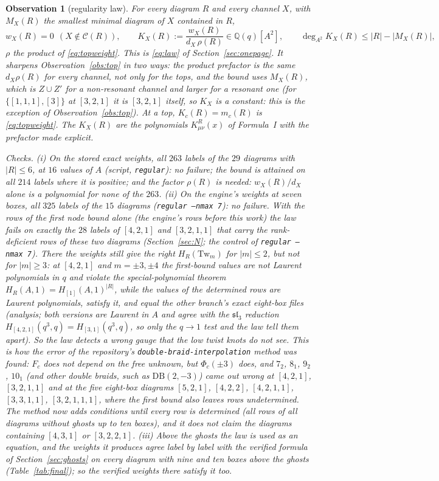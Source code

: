 \documentclass[11pt]{article}
\newtheorem{observation}{Observation}
\newcommand{\Tw}{\mathrm{Tw}}
\newcommand{\Chan}{\mathcal C}
\newcommand{\LMPH}[1]{\texttt{#1}}
\begin{document}
\begin{observation}[regularity law]\label{obs:law}
For every diagram $R$ and every channel $X$, with $M_X(R)$ the smallest minimal diagram of $X$ contained in $R$,
\[
w_X(R)=0\ \ (X\notin\Chan(R)),\qquad
K_X(R):=\frac{w_X(R)}{d_X\,\rho(R)}\in\mathbb Q(q)[A^2],\qquad \deg_{A^2}K_X(R)\le|R|-|M_X(R)|,
\]
$\rho$ the product of \eqref{eq:topweight}.  This is \eqref{eq:law} of Section~\ref{sec:onepage}.  It sharpens
Observation~\ref{obs:top} in two ways: the product prefactor is the same $d_X\rho(R)$ for every channel, not only for the
tops, and the bound uses $M_X(R)$, which is $Z\cup Z'$ for a non-resonant channel and larger for a resonant one (for
$\{[1,1,1],[3]\}$ at $[3,2,1]$ it is $[3,2,1]$ itself, so $K_X$ is a constant: this is the exception of
Observation~\ref{obs:top}).  At a top, $K_c(R)=m_c(R)$ is \eqref{eq:topweight}.  The $K_X(R)$ are the polynomials
$K^R_{\mu\nu}(x)$ of Formula~I with the prefactor made explicit.

\emph{Checks.}  (i) On the stored exact weights, all $263$ labels of the $29$ diagrams with $|R|\le6$, at $16$ values of
$A$ (script, \LMPH{regular}): no failure; the bound is attained on all $214$ labels where it is positive; and the factor
$\rho(R)$ is needed: $w_X(R)/d_X$ alone is a polynomial for none of the $263$.  (ii) On the engine's weights at seven boxes,
all $325$ labels of the $15$ diagrams (\LMPH{regular --nmax 7}): no failure.  With the rows of the first node bound
alone (the engine's rows before this work) the law fails on exactly the $28$ labels of $[4,2,1]$ and $[3,2,1,1]$ that
carry the rank-deficient rows of these two diagrams (Section~\ref{sec:N}; the control of \LMPH{regular --nmax 7}).
There the weights still give the right $H_R(\Tw_m)$ for $|m|\le2$, but not for $|m|\ge3$: at $[4,2,1]$ and
$m=\pm3,\pm4$ the first-bound values are not Laurent polynomials in $q$ and violate the special-polynomial theorem
$H_R(A,1)=H_{[1]}(A,1)^{|R|}$, while the values of the determined rows are Laurent polynomials, satisfy it, and equal the
other branch's exact eight-box files (analysis; both versions are Laurent in $A$ and agree with the $\mathfrak{sl}_3$
reduction $H_{[4,2,1]}(q^3,q)=H_{[3,1]}(q^3,q)$, so only the $q\to1$ test and the law tell them apart).  So the law
detects a wrong gauge that the low twist knots do not see.  This is how the error of the repository's
\LMPH{double-braid-interpolation} method was found: $F_c$ does not depend on the free unknown, but $\Phi_c(\pm3)$ does,
and $7_2$, $8_1$, $9_2$, $10_1$ (and other double braids, such as $\mathrm{DB}(2,-3)$) came out wrong at $[4,2,1]$, $[3,2,1,1]$
and at the five eight-box diagrams $[5,2,1]$, $[4,2,2]$, $[4,2,1,1]$, $[3,3,1,1]$, $[3,2,1,1,1]$, where the first bound
also leaves rows undetermined.  The method now adds conditions until every row is determined (all rows of all
diagrams without ghosts up to ten boxes), and it does not claim the diagrams containing $[4,3,1]$ or $[3,2,2,1]$.  (iii) Above the ghosts the law is used as an equation, and the
weights it produces agree label by label with the verified formula of Section~\ref{sec:ghosts} on every diagram with nine
and ten boxes above the ghosts (Table~\ref{tab:final}); so the verified weights there satisfy it too.
\end{observation}
\end{document}
